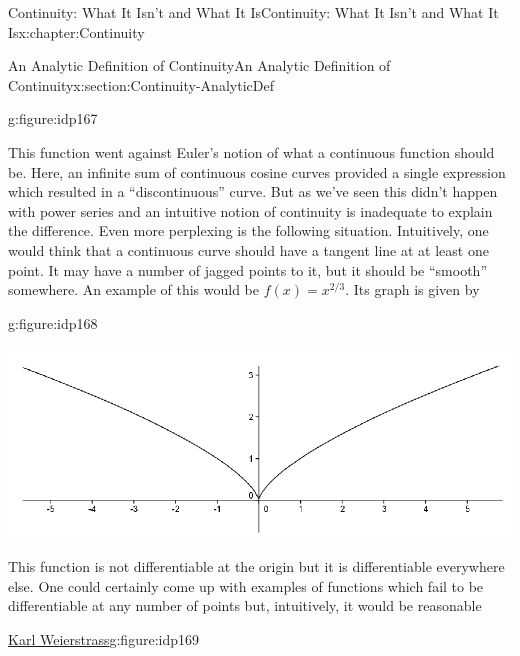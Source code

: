 \begin{chapterptx}{Continuity: What It Isn't and What It Is}{}{Continuity: What It Isn't and What It Is}{}{}{x:chapter:Continuity}
\begin{sectionptx}{An Analytic Definition of Continuity}{}{An Analytic Definition of Continuity}{}{}{x:section:Continuity-AnalyticDef}
\begin{figureptx}{}{g:figure:idp167}{}
\begin{image}{0.125}{0.75}{0.125}
			\end{image}%
			\tcblower
		\end{figureptx}%
		This function went against Euler's notion of what a continuous function should be.  Here, an infinite sum of continuous cosine curves provided a single expression which resulted in a ``discontinuous'' curve.  But as we've seen this didn't happen with power series and an intuitive notion of continuity is inadequate to explain the difference.  Even more perplexing is the following situation.  Intuitively, one would think that a continuous curve should have a tangent line at at least one point.  It may have a number of jagged points to it, but it should be ``smooth'' somewhere.  An example of this would be \(f(x)=x^{2/3}\).  Its graph is given by%
		\begin{figureptx}{}{g:figure:idp168}{}%
			\begin{image}{0.125}{0.75}{0.125}%
				\includegraphics[width=\linewidth]{external/images/Ch5fig2.png}
			\end{image}%
			\tcblower
		\end{figureptx}%
		This function is not differentiable at the origin but it is differentiable everywhere else.  One could certainly come up with examples of functions which fail to be differentiable at any number of points but, intuitively, it would be reasonable%
		\begin{figureptx}{\href{https://mathshistory.st-andrews.ac.uk/Biographies/Weierstrass/}{Karl Weierstrass}\protect\footnotemark{}}{g:figure:idp169}{}%
			\begin{image}{0.325}{0.35}{0.325}%

\end{image}
\end{figureptx}
\end{sectionptx}
\end{chapterptx}
